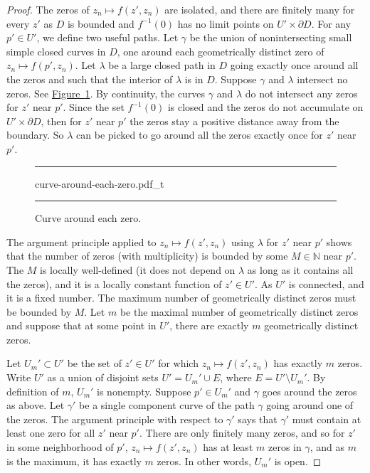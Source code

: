\documentclass[12pt,openany]{book}
\newcommand{\N}{{\mathbb{N}}}
\theoremstyle{plain}
\theoremstyle{remark}
\theoremstyle{definition}
\newenvironment{myfig}{%
\begin{figure}[h!t]
\noindent\rule{\textwidth}{0.5pt}\vspace{12pt}\par\centering}%
{\par\noindent\rule{\textwidth}{0.5pt}
\end{figure}}
\theoremstyle{exercise}
\theoremstyle{example}
\newcommand{\figureref}[1]{\hyperref[#1]{Figure~\ref*{#1}}}
\begin{document}
\begin{proof}
The zeros of $z_n \mapsto f(z',z_n)$ are isolated, and there are finitely
many for every $z'$ as $D$ is bounded and $f^{-1}(0)$ has no limit points on
$U' \times \partial D$.
For any $p' \in U'$, we define two useful paths.
Let $\gamma$ be the union of nonintersecting
small simple closed curves
in $D$, one around each geometrically distinct zero of $z_n \mapsto f(p',z_n)$.
Let $\lambda$ be a large closed path in $D$ going
exactly once around all the zeros and such that the interior of $\lambda$ is
in $D$.  Suppose $\gamma$ and $\lambda$
intersect no zeros.
See \figureref{fig:curve-around-each-zero}.
By continuity,
the curves $\gamma$
and $\lambda$ do not intersect any zeros for $z'$ near $p'$.
Since the set $f^{-1}(0)$ is closed and the zeros
do not
accumulate on $U' \times \partial D$,
then
for $z'$ near $p'$ the zeros stay a positive distance away from
the boundary.  So $\lambda$ can be picked to go
around all the zeros exactly once for $z'$ near $p'$.

\begin{myfig}
{curve-around-each-zero.pdf_t}
\caption{Curve around each zero.\label{fig:curve-around-each-zero}}
\end{myfig}

The argument principle applied to $z_n \mapsto f(z',z_n)$ using $\lambda$ for $z'$ near
$p'$ shows that the number of zeros (with multiplicity) is bounded by some $M \in \N$
near $p'$.  The $M$ is locally well-defined (it does not depend on $\lambda$ as
long as it contains all the zeros), and it is a locally constant function of
$z' \in U'$.
As $U'$ is connected, and it is a fixed number.  The maximum number of
geometrically distinct zeros must be bounded by $M$.  Let $m$ be the maximal
number of geometrically distinct zeros and suppose that at some point
in $U'$, there are exactly $m$ geometrically distinct zeros.

Let $U_m' \subset U'$ be the set of $z' \in U'$ for which $z_n \mapsto f(z',z_n)$
has exactly $m$ zeros.
Write $U'$ as a union of disjoint sets $U' = U_m' \cup E$, where $E = U'
\setminus U_m'$.
By definition of $m$, $U_m'$ is nonempty.  Suppose $p' \in U_m'$ and $\gamma$
goes around the zeros as above.  Let $\gamma'$ be a single component curve
of the path $\gamma$ going around one of the zeros.
The argument principle with respect to $\gamma'$ says that
$\gamma'$ must contain at least one zero for all $z'$ near $p'$.
There are only finitely many zeros, and so for $z'$ in
some neighborhood of $p'$,
$z_n \mapsto f(z',z_n)$ has at least $m$
zeros in $\gamma$, and as $m$ is the maximum, it has exactly $m$ zeros.
In other words, $U_m'$ is open.


\end{proof}
\end{document}
